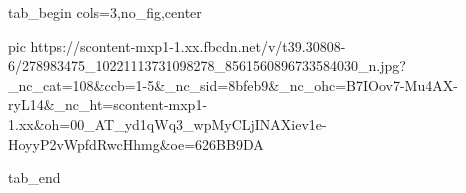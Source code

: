  
 
 
 
 


\ifcmt
  tab_begin cols=3,no_fig,center

     pic https://scontent-mxp1-1.xx.fbcdn.net/v/t39.30808-6/278983475_10221113731098278_8561560896733584030_n.jpg?_nc_cat=108&ccb=1-5&_nc_sid=8bfeb9&_nc_ohc=B7IOov7-Mu4AX-ryL14&_nc_ht=scontent-mxp1-1.xx&oh=00_AT_yd1qWq3_wpMyCLjINAXiev1e-HoyyP2vWpfdRwcHhmg&oe=626BB9DA


  tab_end
\fi
